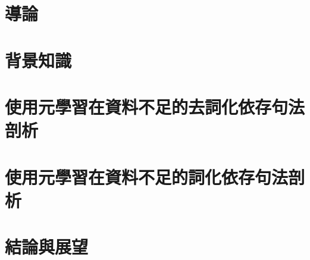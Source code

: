 \chapter{導論}
  
\chapter{背景知識}
  
\chapter{使用元學習在資料不足的去詞化依存句法剖析}
  
\chapter{使用元學習在資料不足的詞化依存句法剖析}
  
\iffalse
\chapter{使用\XNorm在依存句法剖析}
  
\fi
\chapter{結論與展望}
  
